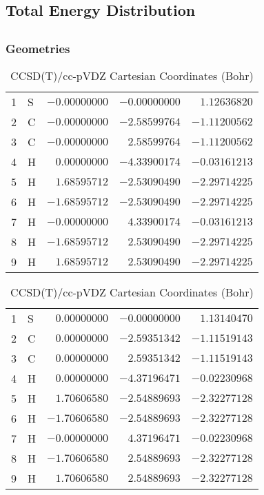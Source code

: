 \documentclass[10pt,oneside]{article}
\begin{document}
\begin{table}
\subsection*{Total Energy Distribution}
\centering\end{table}

\clearpage

\subsection{}

\begin{table}[h!]
\subsubsection*{Geometries}
\begin{multicols}{2}
\centering
\caption{CCSD(T)/cc-pVTZ Cartesian Coordinates (Bohr)}
\begin{tabular}{llrrr}
\toprule
1  & S  & $-0.00000000$ & $-0.00000000$ & $ 1.12636820$ \\
2  & C  & $-0.00000000$ & $-2.58599764$ & $-1.11200562$ \\
3  & C  & $-0.00000000$ & $ 2.58599764$ & $-1.11200562$ \\
4  & H  & $ 0.00000000$ & $-4.33900174$ & $-0.03161213$ \\
5  & H  & $ 1.68595712$ & $-2.53090490$ & $-2.29714225$ \\
6  & H  & $-1.68595712$ & $-2.53090490$ & $-2.29714225$ \\
7  & H  & $-0.00000000$ & $ 4.33900174$ & $-0.03161213$ \\
8  & H  & $-1.68595712$ & $ 2.53090490$ & $-2.29714225$ \\
9  & H  & $ 1.68595712$ & $ 2.53090490$ & $-2.29714225$ \\
\bottomrule
\end{tabular}
\caption{CCSD(T)/cc-pVDZ Cartesian Coordinates (Bohr)}
\begin{tabular}{llrrr}
\toprule
1  & S  & $ 0.00000000$ & $-0.00000000$ & $ 1.13140470$ \\
2  & C  & $ 0.00000000$ & $-2.59351342$ & $-1.11519143$ \\
3  & C  & $ 0.00000000$ & $ 2.59351342$ & $-1.11519143$ \\
4  & H  & $ 0.00000000$ & $-4.37196471$ & $-0.02230968$ \\
5  & H  & $ 1.70606580$ & $-2.54889693$ & $-2.32277128$ \\
6  & H  & $-1.70606580$ & $-2.54889693$ & $-2.32277128$ \\
7  & H  & $-0.00000000$ & $ 4.37196471$ & $-0.02230968$ \\
8  & H  & $-1.70606580$ & $ 2.54889693$ & $-2.32277128$ \\
9  & H  & $ 1.70606580$ & $ 2.54889693$ & $-2.32277128$ \\
\bottomrule
\end{tabular}
\end{multicols}
\end{table}
\end{document}
